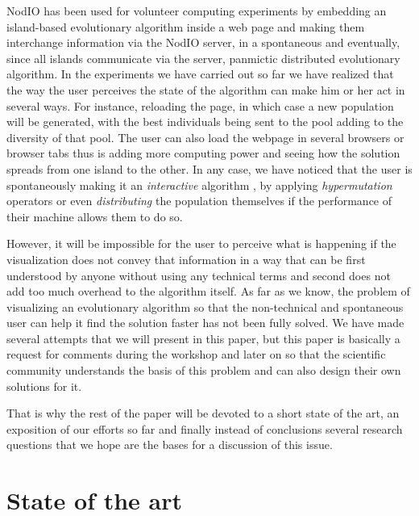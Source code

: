 \documentclass{sig-alternate}
\begin{document}
NodIO has been used for volunteer computing experiments by
embedding an island-based evolutionary algorithm inside a web page and
making them interchange information via the NodIO server, in a
spontaneous and eventually, since all islands communicate via the
server, panmictic distributed evolutionary
algorithm. In the experiments we have carried out so far we have
realized that the way the user perceives the state of the algorithm
can make him or her act in several ways. For instance, reloading the
page, in which case a new population will be generated, with the best
individuals being sent to the pool adding to the diversity of that
pool. The user can also load the webpage in several browsers or
browser tabs thus is adding more computing power and seeing how the 
solution spreads from one island to the other. In any case, we have noticed
that the user is spontaneously making it an {\em interactive}
algorithm \cite{takagi01interactive}, by applying {\em hypermutation} 
operators or even {\em distributing} the population themselves if the 
performance of their machine allows them to do so. 

However, it will be impossible for the user to perceive what is
happening if the visualization does not convey that information in a
way that can be first understood by anyone without using any technical
terms and second does not add too much overhead to the algorithm
itself. As far as we know, the problem of visualizing an evolutionary
algorithm so that the non-technical and spontaneous user can help it
find the solution faster has not been fully solved. We have made several
attempts that we will present in this paper, but this paper is
basically a request for comments during the workshop and later on so
that the scientific community understands the basis of this problem
and can also design their own solutions for it.

That is why the rest of the paper will be devoted to a short state of
the art, an exposition of our efforts so far and finally instead of
conclusions several research questions that we hope are the bases for
a discussion of this issue.



\section{State of the art}
\label{sec:soa}
\end{document}
